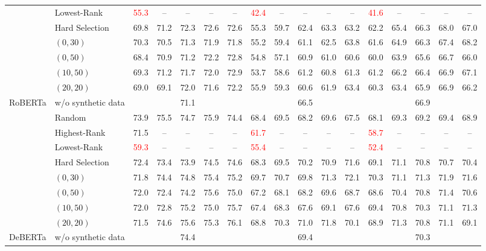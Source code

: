 \begin{table}[t]
\begin{tabular}{llccccccccccccccc}
 & Lowest-Rank & \textcolor{red}{55.3} & -- & -- & -- & -- & \textcolor{red}{42.4} & -- & -- & -- & -- & \textcolor{red}{41.6} & -- & -- & -- & -- \\
 & Hard Selection & 69.8 & 71.2 & 72.3 & 72.6 & 72.6 & 55.3 & 59.7 & 62.4 & 63.3 & 63.2 & 62.2 & 65.4 & 66.3 & 68.0 & 67.0 \\
 & $(0, 30)$ & 70.3 & 70.5 & 71.3 & 71.9 & 71.8 & 55.2 & 59.4 & 61.1 & 62.5 & 63.8 & 61.6 & 64.9 & 66.3 & 67.4 & 68.2 \\
 & $(0, 50)$ & 68.4 & 70.9 & 71.2 & 72.2 & 72.8 & 54.8 & 57.1 & 60.9 & 61.0 & 60.6 & 60.0 & 63.9 & 65.6 & 66.7 & 66.0 \\
 & $(10, 50)$ & 69.3 & 71.2 & 71.7 & 72.0 & 72.9 & 53.7 & 58.6 & 61.2 & 60.8 & 61.3 & 61.2 & 66.2 & 66.4 & 66.9 & 67.1 \\
 & $(20, 20)$ & 69.0 & 69.1 & 72.0 & 71.6 & 72.2 & 55.9 & 59.3 & 60.6 & 61.9 & 63.4 & 60.3 & 63.4 & 65.9 & 66.9 & 66.2 \\
\midrule
\multirow{9}{*}{RoBERTa} & w/o synthetic data & \multicolumn{5}{c}{71.1} & \multicolumn{5}{c}{66.5} & \multicolumn{5}{c}{66.9} \\
 & Random & 73.9 & 75.5 & 74.7 & 75.9 & 74.4 & 68.4 & 69.5 & 68.2 & 69.6 & 67.5 & 68.1 & 69.3 & 69.2 & 69.4 & 68.9 \\
 & Highest-Rank & 71.5 & -- & -- & -- & -- & \textcolor{red}{61.7} & -- & -- & -- & -- & \textcolor{red}{58.7} & -- & -- & -- & -- \\
 & Lowest-Rank & \textcolor{red}{59.3} & -- & -- & -- & -- & \textcolor{red}{55.4} & -- & -- & -- & -- & \textcolor{red}{52.4} & -- & -- & -- & -- \\
 & Hard Selection & 72.4 & 73.4 & 73.9 & 74.5 & 74.6 & 68.3 & 69.5 & 70.2 & 70.9 & 71.6 & 69.1 & 71.1 & 70.8 & 70.7 & 70.4 \\
 & $(0, 30)$ & 71.8 & 74.4 & 74.8 & 75.4 & 75.2 & 69.7 & 70.7 & 69.8 & 71.3 & 72.1 & 70.3 & 71.1 & 71.3 & 71.9 & 71.6 \\
 & $(0, 50)$ & 72.0 & 72.4 & 74.2 & 75.6 & 75.0 & 67.2 & 68.1 & 68.2 & 69.6 & 68.7 & 68.6 & 70.4 & 70.8 & 71.4 & 70.6 \\
 & $(10, 50)$ & 72.0 & 72.8 & 75.2 & 75.0 & 75.7 & 67.4 & 68.3 & 67.6 & 69.1 & 67.6 & 69.4 & 70.8 & 70.3 & 71.1 & 71.3 \\
 & $(20, 20)$ & 71.5 & 74.6 & 75.6 & 75.3 & 76.1 & 68.8 & 70.3 & 71.0 & 71.8 & 70.1 & 68.9 & 71.3 & 70.8 & 71.1 & 69.1 \\
\midrule
\multirow{9}{*}{DeBERTa} & w/o synthetic data & \multicolumn{5}{c}{74.4} & \multicolumn{5}{c}{69.4} & \multicolumn{5}{c}{70.3} \\

\end{tabular}
\end{table}
